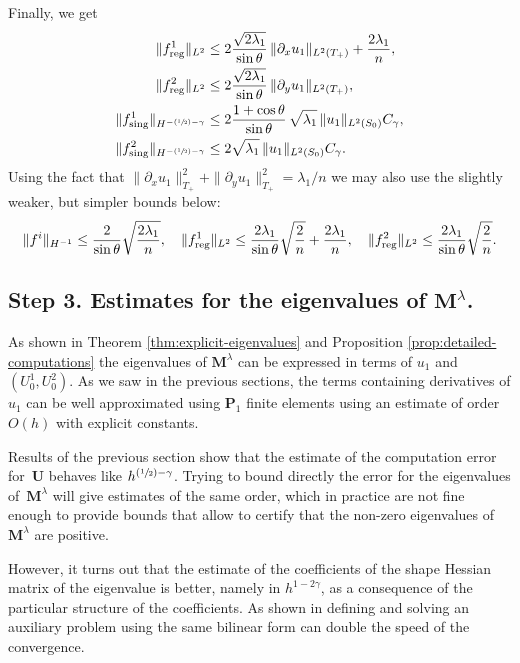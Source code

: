 \documentclass[JEP,XML,SOM,Unicode,ThmDefs,NoFloatCountersInSection,published]{cedram}
\newcommand{\Psfrac}[2]{(\sfrac{#1}{#2})}
\theoremstyle{plain}
\theoremstyle{definition}
\newcommand{\bo}[1]{{\boldsymbol#1}}
\newcommand{\reg}{\textup{reg}}
\newcommand{\sing}{\textup{sing}}
\newcommand{\lb}{\lambda}
\begin{document}
Finally, we get
\begin{align*}
\|f^1_{\reg}\|_{L^2} &\leq 2\frac{\sqrt{2\lambda_1}}{\sin \theta}\, \|\partial_x u_1\|_{L^2(T_+)}+\frac{2\lambda_1}{n},\\
\|f^2_{\reg}\|_{L^2} &\leq 2\frac{\sqrt{2\lambda_1}}{\sin \theta}\,\|\partial_y u_1\|_{L^2(T_+)},\\
\|f^1_{\sing}\|_{H^{-\Psfrac 12-\gamma}} &\le 2 \frac{1+ \cos \theta}{ \sin \theta}\, \sqrt{ \lb_1 }\, \|u_1\|_{L^2(S_0)}C_\gamma,\\
\|f^2_{\sing}\|_{H^{-\Psfrac 12-\gamma}} &\le 2 \sqrt{ \lb_1 }\, \|u_1 \|_{L^2(S_0)}C_\gamma.
\end{align*}
Using the fact that $\|\partial_x u_1\|_{T_+}^2+ \|\partial_y u_1\|_{T_+}^2 = \lambda_1/n$ we may also use the slightly weaker, but simpler bounds below:
\[
\|f^i\|_{H^{-1}} \leq \frac{2 }{\sin\theta } \sqrt{\frac{2\lambda_1}{n}},\quad
\|f^1_{\reg}\|_{L^2} \leq \frac{2\lambda_1}{\sin \theta}\sqrt{\frac{2}{n}}+\frac{2\lambda_1}{n},\quad
\|f^2_{\reg}\|_{L^2} \leq \frac{2\lambda_1}{\sin \theta}\sqrt{\frac{2}{n}}.
\]

\subsection{Step 3. Estimates for the eigenvalues of $\bo M^\lb$.}
\label{sec:estimates-coeffs}
As shown in Theorem \ref{thm:explicit-eigenvalues} and Proposition \ref{prop:detailed-computations} the eigenvalues of $\bo M^\lambda$ can be expressed in terms of $u_1$ and $(U_0^1,U_0^2)$. As we saw in the previous sections, the terms containing derivatives of $u_1$ can be well approximated using $\bo P_1$ finite elements using an estimate of order $O(h)$ with explicit constants.

Results of the previous section show that the estimate of the computation error for~$\bo U$ behaves like $h^{\Psfrac 12 -\gamma}$. Trying to bound directly the error for the eigenvalues of~$\bo M^\lambda$ will give estimates of the same order, which in practice are not fine enough to provide bounds that allow to certify that the non-zero eigenvalues of $\bo M^\lambda$ are positive.

However, it turns out that the estimate of the coefficients of the shape Hessian matrix of the eigenvalue is better, namely in $h^{1-2\gamma}$, as a consequence of the particular structure of the coefficients. As shown in \cite[\S 5]{approximation-trick} defining and solving an auxiliary problem using the same bilinear form can double the speed of the convergence.
\end{document}
